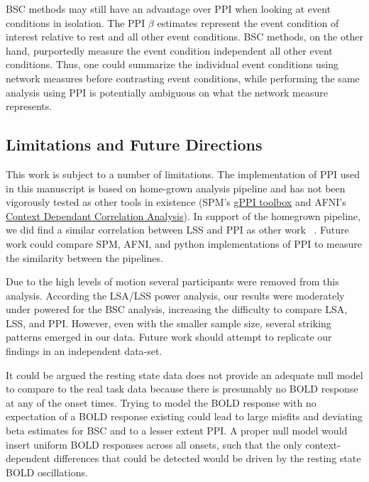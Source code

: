 \documentclass[phd,appendix,figures]{uithesis}
\begin{document}
BSC methods may still have an advantage over PPI when looking at event conditions in isolation.
The PPI $\beta$ estimates represent the event condition of interest relative to rest and all other
event conditions.
BSC methods, on the other hand, purportedly measure the event condition independent all other event conditions.
Thus, one could summarize the individual event conditions using network measures before contrasting event conditions,
while performing the same analysis using PPI is potentially ambiguous on what the network measure represents.

\subsection{Limitations and Future Directions}
This work is subject to a number of limitations.
The implementation of PPI used in this manuscript is based on
home-grown analysis pipeline and has not been vigorously tested
as other tools in existence (SPM's \href{https://www.nitrc.org/projects/gppi}{gPPI toolbox}
and AFNI's \href{https://afni.nimh.nih.gov/CD-CorrAna}{Context Dependant Correlation Analysis}).
In support of the homegrown pipeline, we did find a similar correlation between LSS and PPI as
other work ~\cite{Di2019a}.
Future work could compare SPM, AFNI, and python implementations of PPI to measure the similarity
between the pipelines.

Due to the high levels of motion several participants were removed from this analysis.
According the LSA/LSS power analysis, our results were moderately under powered for the BSC analysis,
increasing the difficulty to compare LSA, LSS, and PPI.
However, even with the smaller sample size, several striking patterns emerged in our data.
Future work should attempt to replicate our findings in an independent data-set.

It could be argued the resting state data does not provide an adequate null model
to compare to the real task data because there is presumably no BOLD response at any
of the onset times.
Trying to model the BOLD response with no expectation of a BOLD response existing could lead
to large misfits and deviating beta estimates for BSC and to a lesser extent PPI.
A proper null model would insert uniform BOLD responses across all onsets, such that
the only context-dependent differences that could be detected would be driven by the
resting state BOLD oscillations.
\end{document}
